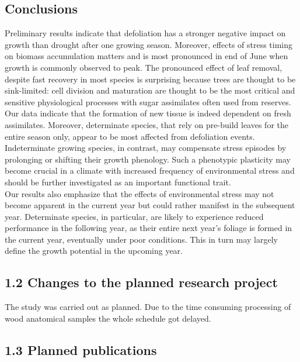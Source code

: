 \documentclass{article}
\begin{document}
	
	\subsection*{Conclusions}
	Preliminary results indicate that defoliation has a stronger negative impact on growth than drought after one growing season. Moreover, effects of stress timing on biomass accumulation matters and is most pronounced in end of June when growth is commonly observed to peak. The pronounced effect of leaf removal, despite fast recovery in most species is surprising because trees are thought to be sink-limited: cell division and maturation are thought to be the most critical and sensitive physiological processes with sugar assimilates often used from reserves. Our data indicate that the formation of new tissue is indeed dependent on fresh assimilates. Moreover, determinate species, that rely on pre-build leaves for the entire season only, appear to be most affected from defoliation events. Indeterminate growing species, in contrast, may compensate stress episodes by prolonging or shifting their growth phenology. Such a phenotypic plasticity may become crucial in a climate with increased frequency of environmental stress and should be further investigated as an important functional trait.\\
	
	Our results also emphasize that the effects of environmental stress may not become apparent in the current year but could rather manifest in the subsequent year. Determinate species, in particular, are likely to experience reduced performance in the following year, as their entire next year's foliage is formed in the current year, eventually under poor conditions. This in turn may largely define the growth potential in the upcoming year.\\
	
	
	\subsection*{1.2 Changes to the planned research project}
	The study was carried out as planned. Due to the time consuming processing of wood anatomical samples the whole schedule got delayed. \\
	
	\subsection*{1.3 Planned publications}
	
\end{document}

